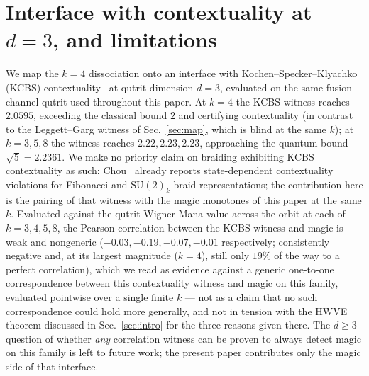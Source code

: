 \documentclass[aps,pra,twocolumn,superscriptaddress,longbibliography,floatfix,nofootinbib]{revtex4-2}
\begin{document}
\section{Interface with contextuality at $d=3$, and limitations}
\label{sec:t5}

We map the $k=4$ dissociation onto an interface with
Kochen--Specker--Klyachko (KCBS) contextuality~\cite{KCBS2008,%
Chou2026} at qutrit dimension $d=3$, evaluated on the same
fusion-channel qutrit used throughout this paper. At $k=4$ the KCBS
witness reaches $2.0595$, exceeding the classical bound $2$ and
certifying contextuality (in contrast to the Leggett--Garg witness of
Sec.~\ref{sec:map}, which is blind at the same $k$); at $k=3,5,8$ the
witness reaches $2.22,2.23,2.23$, approaching the quantum bound
$\sqrt5=2.2361$. We make no priority claim on braiding exhibiting KCBS
contextuality as such: Chou~\cite{Chou2026} already reports
state-dependent contextuality violations for Fibonacci and
$\mathrm{SU}(2)_k$ braid representations; the contribution here is
the pairing of that witness with the magic monotones of this paper at
the same $k$. Evaluated against the qutrit Wigner-Mana value across
the orbit at each of $k=3,4,5,8$, the Pearson correlation
between the KCBS witness and magic is weak and nongeneric
($-0.03,-0.19,-0.07,-0.01$ respectively; consistently negative and,
at its largest magnitude ($k=4$), still only $19\%$ of the way to a
perfect correlation), which we read as evidence against a
generic one-to-one correspondence between this contextuality witness
and magic on this family, evaluated pointwise over a single finite
$k$ --- not as a claim that no such correspondence could hold more
generally, and not in tension with the HWVE theorem discussed in
Sec.~\ref{sec:intro} for the three reasons given there. The
$d\ge3$ question of whether \emph{any} correlation witness can be
proven to always detect magic on this family is left to future work;
the present paper contributes only the magic side of that interface.
\end{document}
